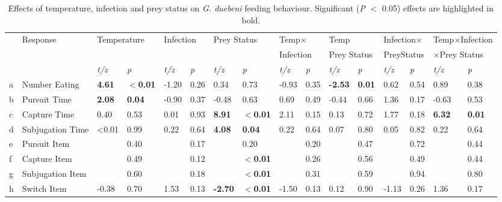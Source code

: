 \begin{landscape}
\begin{table}
\caption[The effects of temperature, parasitic infection, and prey mobility status on the feeding behaviour of  \emph{G. duebeni}.]{Effects of temperature, infection and prey status on \emph{G. duebeni} feeding behaviour. Significant (\emph{P} $<$ 0.05) effects are highlighted in bold.}
\label{tab:feedtab}
\begin{tabular}{llllllllllllllll} \toprule
 & Response & \multicolumn{2}{l}{Temperature} & \multicolumn{2}{l}{Infection} & \multicolumn{2}{l}{Prey Status} & \multicolumn{2}{l}{Temp$\times$} & \multicolumn{2}{l}{Temp} & \multicolumn{2}{l}{Infection$\times$} & \multicolumn{2}{l}{Temp$\times$Infection} \\
 &  & \multicolumn{2}{l}{} & \multicolumn{2}{l}{} & \multicolumn{2}{l}{} & \multicolumn{2}{l}{Infection} & \multicolumn{2}{l}{Prey Status} & \multicolumn{2}{l}{PreyStatus} & \multicolumn{2}{l}{$\times$Prey Status} \\ \midrule
 &   & \emph{t/z} & \emph{p} &\emph{t/z} & \emph{p} & \emph{t/z} & \emph{p} & \emph{t/z} & \emph{p} & \emph{t/z} & \emph{p} & \emph{t/z} & \emph{p} & \emph{t/z} & \emph{p} \\ 
a & Number Eating & \textbf{4.61} & \textbf{$<$0.01} & -1.20 & 0.26 & 0.34 & 0.73 & -0.93 & 0.35 & \textbf{-2.53} & \textbf{0.01} & 0.62 & 0.54 & 0.89 & 0.38 \\
b & Pursuit Time & \textbf{2.08} & \textbf{0.04} & -0.90 & 0.37 & -0.48 & 0.63 & 0.69 & 0.49 & -0.44 & 0.66 & 1.36 & 0.17 & -0.63 & 0.53 \\
c & Capture Time & 0.40 & 0.53 & 0.01 & 0.93 & \textbf{8.91} & \textbf{$<$0.01} & 2.11 & 0.15 & 0.13 & 0.72 & 1.77 & 0.18 & \textbf{6.32} & \textbf{0.01} \\
d & Subjugation Time & <0.01 & 0.99 & 0.22 & 0.64 & \textbf{4.08} & \textbf{0.04} & 0.22 & 0.64 & 0.07 & 0.80 & 0.05 & 0.82 & 0.22 & 0.64 \\
e & Pursuit Item &  & 0.40 &  & 0.17 &  & 0.20 &  & 0.20 &  & 0.47 &  & 0.72 &  & 0.44 \\
f & Capture Item  &  & 0.49 &  & 0.12 &  & \textbf{$<$0.01} &  & 0.26 &  & 0.56 &  & 0.49 &  & 0.44 \\
g & Subjugation Item &  & 0.60 &  & 0.18 &  & \textbf{$<$0.01} &  & 0.31 &  & 0.59 &  & 0.94 &  & 0.80 \\
h & Switch Item & -0.38 & 0.70 & 1.53 & 0.13 & \textbf{-2.70} & \textbf{$<$0.01} & -1.50 & 0.13 & 0.12 & 0.90 & -1.13 & 0.26 & 1.36 & 0.17 \\ \bottomrule
\end{tabular}
\end{table}
\end{landscape}

